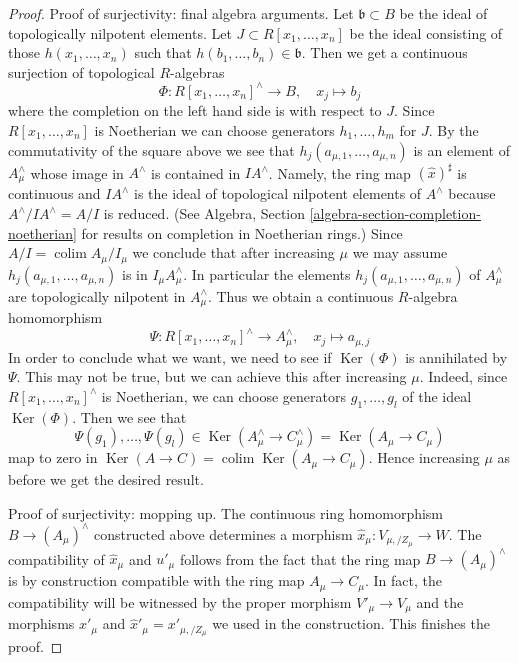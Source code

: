 \documentclass{stacks-project}
\theoremstyle{plain}
\theoremstyle{definition}
\theoremstyle{remark}
\numberwithin{equation}{subsection}
\def\colim{\mathop{\mathrm{colim}}\nolimits}
\def\Ker{\mathop{\mathrm{Ker}}}
\begin{document}
\begin{proof}
\medskip\noindent
Proof of surjectivity: final algebra arguments.
Let $\mathfrak b \subset B$ be the ideal of topologically nilpotent
elements. Let $J \subset R[x_1, \ldots, x_n]$ be the ideal
consisting of those $h(x_1, \ldots, x_n)$ such that
$h(b_1, \ldots, b_n) \in \mathfrak b$. Then we get a continuous
surjection of topological $R$-algebras
$$
\Phi : R[x_1, \ldots, x_n]^\wedge \longrightarrow B,\quad
x_j \longmapsto b_j
$$
where the completion on the left hand side is with respect to $J$.
Since $R[x_1, \ldots, x_n]$ is Noetherian we can choose
generators $h_1, \ldots, h_m$ for $J$. By the commutativity
of the square above we see that $h_j(a_{\mu, 1}, \ldots, a_{\mu, n})$ is
an element of $A_\mu^\wedge$ whose image in $A^\wedge$ is contained
in $IA^\wedge$. Namely, the ring map $(\hat x)^\sharp$ is continuous
and $IA^\wedge$ is the ideal of topological nilpotent elements
of $A^\wedge$ because $A^\wedge/IA^\wedge = A/I$ is reduced.
(See Algebra, Section \ref{algebra-section-completion-noetherian}
for results on completion in Noetherian rings.)
Since $A/I = \colim A_\mu/I_\mu$ we conclude that after increasing
$\mu$ we may assume $h_j(a_{\mu, 1}, \ldots, a_{\mu, n})$ is in
$I_\mu A_\mu^\wedge$. In particular the elements
$h_j(a_{\mu, 1}, \ldots, a_{\mu, n})$ of $A_\mu^\wedge$
are topologically nilpotent in $A_\mu^\wedge$.
Thus we obtain a continuous $R$-algebra homomorphism
$$
\Psi : R[x_1, \ldots, x_n]^\wedge \longrightarrow A_\mu^\wedge,\quad
x_j \longmapsto a_{\mu, j}
$$
In order to conclude what we want, we need to see if $\Ker(\Phi)$ is
annihilated by $\Psi$. This may not be true, but we can achieve
this after increasing $\mu$. Indeed, since
$R[x_1, \ldots, x_n]^\wedge$ is Noetherian,
we can choose generators $g_1, \ldots, g_l$ of the ideal
$\Ker(\Phi)$. Then we see that
$$
\Psi(g_1), \ldots, \Psi(g_l) \in
\Ker(A_\mu^\wedge \to C_\mu^\wedge) = \Ker(A_\mu \to C_\mu)
$$
map to zero in $\Ker(A \to C) = \colim \Ker(A_\mu \to C_\mu)$.
Hence increasing $\mu$ as before we get the desired result.

\medskip\noindent
Proof of surjectivity: mopping up. The continuous ring homomorphism
$B \to (A_\mu)^\wedge$ constructed above determines a morphism
$\hat x_\mu : V_{\mu, /Z_\mu} \to W$.
The compatibility of $\hat x_\mu$ and $u'_\mu$ follows
from the fact that the ring map $B \to (A_\mu)^\wedge$
is by construction compatible with the ring map $A_\mu \to C_\mu$.
In fact, the compatibility will be witnessed by the proper morphism
$V'_\mu \to V_\mu$ and the morphisms
$x'_\mu$ and $\hat x'_\mu = x'_{\mu, /Z_\mu}$ we used in
the construction. This finishes the proof.
\end{proof}
\end{document}
